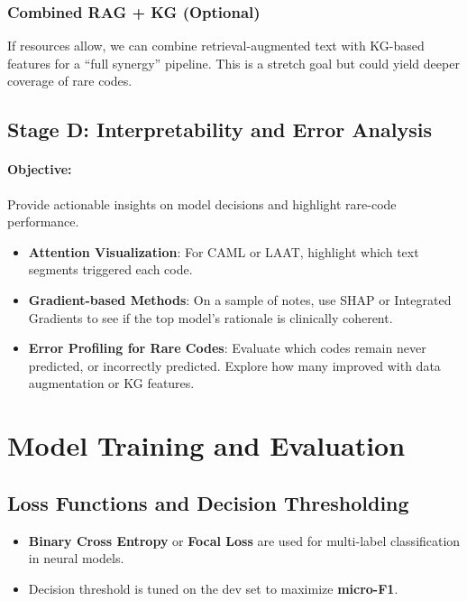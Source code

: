 \documentclass[12pt,a4paper]{report}
\begin{document}
\subsubsection{Combined RAG + KG (Optional)}
If resources allow, we can combine retrieval-augmented text with KG-based features for a “full synergy” pipeline. This is a stretch goal but could yield deeper coverage of rare codes.

\subsection{Stage D: Interpretability and Error Analysis}
\paragraph{Objective:} Provide actionable insights on model decisions and highlight rare-code performance.

\begin{itemize}
    \item \textbf{Attention Visualization}: For CAML or LAAT, highlight which text segments triggered each code.
    \item \textbf{Gradient-based Methods}: On a sample of notes, use SHAP or Integrated Gradients to see if the top model’s rationale is clinically coherent.
    \item \textbf{Error Profiling for Rare Codes}: Evaluate which codes remain never predicted, or incorrectly predicted. Explore how many improved with data augmentation or KG features.
\end{itemize}


\section{Model Training and Evaluation}

\subsection{Loss Functions and Decision Thresholding}
\begin{itemize}
    \item \textbf{Binary Cross Entropy} or \textbf{Focal Loss} are used for multi-label classification in neural models.
    \item Decision threshold is tuned on the dev set to maximize \textbf{micro-F1}.
\end{itemize}
\end{document}
